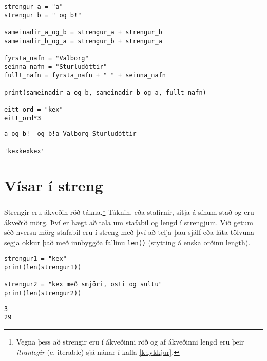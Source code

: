 \begin{lstlisting}[caption=Samskeyting og lenging strengja, label=lst:str-conmul]
strengur_a = "a"
strengur_b = " og b!"

sameinadir_a_og_b = strengur_a + strengur_b
sameinadir_b_og_a = strengur_b + strengur_a

fyrsta_nafn = "Valborg"
seinna_nafn = "Sturludóttir"
fullt_nafn = fyrsta_nafn + " " + seinna_nafn

print(sameinadir_a_og_b, sameinadir_b_og_a, fullt_nafn)

eitt_ord = "kex"
eitt_ord*3
\end{lstlisting}
\lstset{style=uttak}
\begin{lstlisting}
a og b!  og b!a Valborg Sturludóttir

'kexkexkex'
\end{lstlisting}
\lstset{style=venjulegt}

\section{Vísar í streng}
Strengir eru ákveðin röð tákna.\footnote{Vegna þess að strengir eru í ákveðinni röð og af ákveðinni lengd eru þeir \emph{ítranlegir} (e. iterable) sjá nánar í kafla \ref{k:lykkjur}.}
Táknin, eða stafirnir, sitja á sínum stað og eru ákveðið mörg.
Því er hægt að tala um stafabil og lengd í strengjum.
Við getum séð hversu mörg stafabil eru í streng með því að telja þau sjálf eða láta tölvuna segja okkur það með innbyggða fallinu \texttt{len()} (stytting á enska orðinu length).

\begin{lstlisting}[caption=Stafabilafjöldi, label=lst:str-stafabil]
strengur1 = "kex"
print(len(strengur1))

strengur2 = "kex með smjöri, osti og sultu"
print(len(strengur2))
\end{lstlisting}
\lstset{style=uttak}
\begin{lstlisting}
3
29
\end{lstlisting}
\lstset{style=venjulegt}

